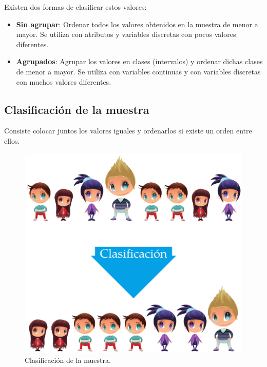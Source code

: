 \documentclass[
  a4paper,
]{scrreport}
\theoremstyle{definition}
\theoremstyle{definition}
\theoremstyle{plain}
\theoremstyle{remark}
\begin{document}
Existen dos formas de clasificar estos valores:

\begin{itemize}
\item
  \textbf{Sin agrupar}: Ordenar todos los valores obtenidos en la
  muestra de menor a mayor. Se utiliza con atributos y variables
  discretas con pocos valores diferentes.
\item
  \textbf{Agrupados}: Agrupar los valores en clases (intervalos) y
  ordenar dichas clases de menor a mayor. Se utiliza con variables
  continuas y con variables discretas con muchos valores diferentes.
\end{itemize}

\hypertarget{clasificaciuxf3n-de-la-muestra}{%
\subsection{Clasificación de la
muestra}\label{clasificaciuxf3n-de-la-muestra}}

Consiste colocar juntos los valores iguales y ordenarlos si existe un
orden entre ellos.

\begin{figure}

{\centering \includegraphics{img/descriptiva/clasificacion_muestra.png}

}

\caption{Clasificación de la muestra.}

\end{figure}
\end{document}
